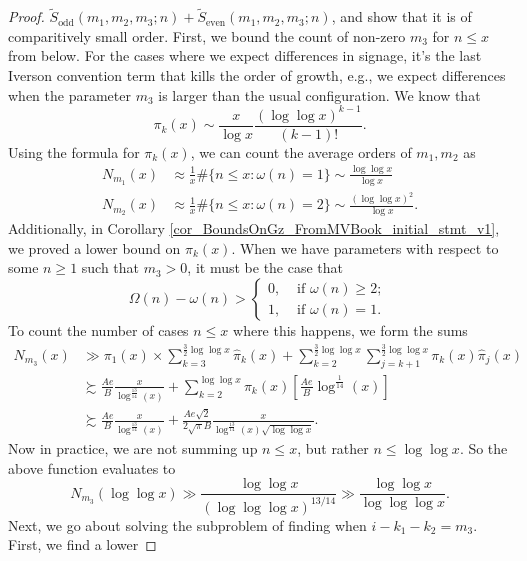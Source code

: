 \documentclass[11pt,reqno,a4letter]{article}
\numberwithin{figure}{section}
\numberwithin{table}{section}
\theoremstyle{plain}
\numberwithin{theorem}{section}
\theoremstyle{definition}
\begin{document}
\begin{proof}
$\widetilde{S}_{\operatorname{odd}}(m_1, m_2, m_3; n) + \widetilde{S}_{\operatorname{even}}(m_1, m_2, m_3; n)$, 
and show that it is of comparitively small order. First, we bound the count of non-zero $m_3$ for 
$n \leq x$ from below. 
For the cases where we expect differences in 
signage, it's the last Iverson convention term that kills the order of growth, e.g., we expect differences 
when the parameter $m_3$ is larger than the usual configuration. 
We know that 
\[
\pi_k(x) \sim \frac{x}{\log x} \frac{(\log\log x)^{k-1}}{(k-1)!}. 
\]
Using the formula for $\pi_k(x)$, we can count the average orders of $m_1,m_2$ as 
\begin{align*}
N_{m_1}(x) & \approx \frac{1}{x} \#\{n \leq x: \omega(n) = 1\} \sim \frac{\log\log x}{\log x} \\ 
N_{m_2}(x) & \approx \frac{1}{x} \#\{n \leq x: \omega(n) = 2\} \sim \frac{(\log\log x)^2}{\log x}. 
\end{align*} 
Additionally, in Corollary \ref{cor_BoundsOnGz_FromMVBook_initial_stmt_v1}, 
we proved a lower bound on $\widehat{\pi}_k(x)$. 
When we have parameters with respect to some $n \geq 1$ 
such that $m_3 > 0$, it must be the case that 
\[
\Omega(n) - \omega(n) > \begin{cases} 
     0, & \text{ if $\omega(n) \geq 2$; } \\ 
     1, & \text{ if $\omega(n) = 1$. } 
     \end{cases}
\]
To count the number of cases $n \leq x$ where this happens, we form the sums 
\begin{align*} 
N_{m_3}(x) & \gg \pi_1(x) \times \sum_{k=3}^{\frac{3}{2} \log\log x} \widehat{\pi}_k(x) + 
     \sum_{k=2}^{\frac{3}{2} \log\log x} \sum_{j=k+1}^{\frac{3}{2} \log\log x} 
     \pi_k(x) \widehat{\pi}_j(x) \\ 
     & \succsim \frac{Ae}{B} \frac{x}{\log^{\frac{13}{14}}(x)} + 
     \sum_{k=2}^{\log\log x} \pi_k(x) \left[ 
     \frac{Ae}{B} \log^{\frac{1}{14}}(x) 
     \right] \\ 
     & \succsim \frac{Ae}{B} \frac{x}{\log^{\frac{13}{14}}(x)} + 
     \frac{Ae \sqrt{2}}{2 \sqrt{\pi} B} \frac{x}{\log^{\frac{13}{14}}(x) \sqrt{\log\log x}}. 
\end{align*} 
Now in practice, we are not summing up $n \leq x$, but rather $n \leq \log\log x$. So the 
above function evaluates to 
\[
N_{m_3}(\log\log x) \gg \frac{\log\log x}{(\log\log\log x)^{13/14}} \gg 
     \frac{\log\log x}{\log\log\log x}. 
\]
Next, we go about solving the subproblem of finding when $i-k_1-k_2 = m_3$. First, we find a lower 

\end{proof}
\end{document}
